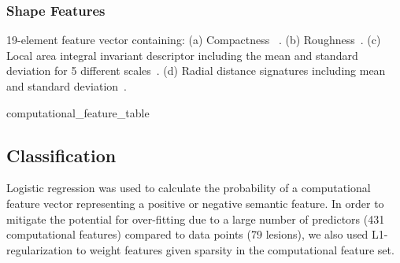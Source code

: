\subsubsection{Shape Features}
19-element feature vector containing: (a) Compactness ~\cite{Duda:1973ul}. (b) Roughness~\cite{Kilday:2002wp}. (c) Local area integral invariant descriptor including the mean and standard deviation for 5 different scales~\cite{Hong:2006ti,Manay:2006un}. (d) Radial distance signatures including mean and standard deviation~\cite{MRangayyan:2005td}.

{computational_feature_table}

\subsection{Classification}
Logistic regression was used to calculate the probability of a computational feature vector representing a positive or negative semantic feature. In order to mitigate the potential for over-fitting due to a large number of predictors (431 computational features) compared to data points (79 lesions), we also used L1-regularization \cite{Tibshirani:1996wb} to weight features given sparsity in the computational feature set.
